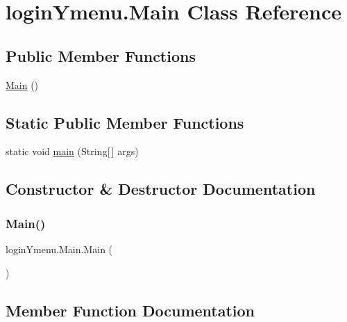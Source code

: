 \hypertarget{classlogin_ymenu_1_1_main}{}\section{login\+Ymenu.\+Main Class Reference}
\label{classlogin_ymenu_1_1_main}
\subsection*{Public Member Functions}
\begin{DoxyCompactItemize}
\item 
\mbox{\hyperlink{classlogin_ymenu_1_1_main_a9ea3388e0ec20d1c35b08a7b395ecf8e}{Main}} ()
\end{DoxyCompactItemize}
\subsection*{Static Public Member Functions}
\begin{DoxyCompactItemize}
\item 
static void \mbox{\hyperlink{classlogin_ymenu_1_1_main_ab0717ea1b0f2038727d03654f8a80599}{main}} (String\mbox{[}$\,$\mbox{]} args)
\end{DoxyCompactItemize}


\subsection{Constructor \& Destructor Documentation}
\mbox{\label{classlogin_ymenu_1_1_main_a9ea3388e0ec20d1c35b08a7b395ecf8e}} 
\subsubsection{\texorpdfstring{Main()}{Main()}}
{\footnotesize\ttfamily login\+Ymenu.\+Main.\+Main (\begin{DoxyParamCaption}{ }\end{DoxyParamCaption})}



\subsection{Member Function Documentation}
\mbox{\label{classlogin_ymenu_1_1_main_ab0717ea1b0f2038727d03654f8a80599}} 
